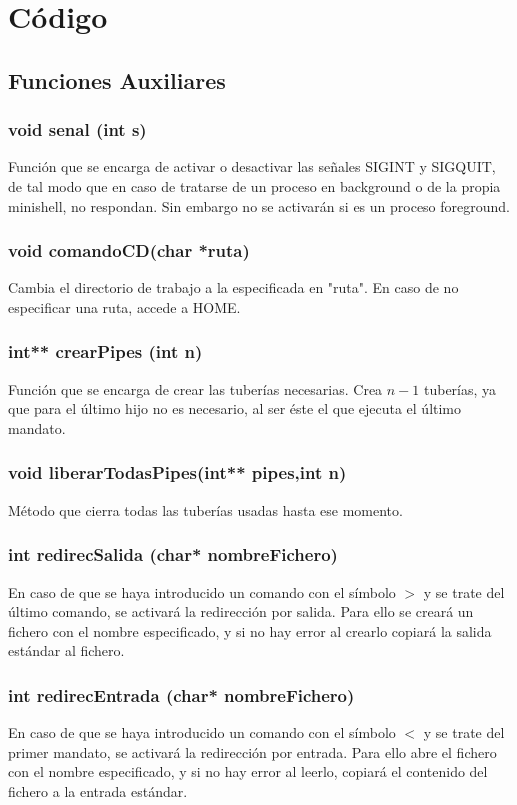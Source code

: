\chapter{Código}
\section{Funciones Auxiliares}
\subsection{void senal (int s)}
Función que se encarga de activar o desactivar las señales SIGINT y SIGQUIT, de tal modo que en caso de tratarse de un proceso en background o de la propia minishell, no respondan. Sin embargo no se activarán si es un proceso foreground.
\subsection{void comandoCD(char *ruta)}
Cambia el directorio de trabajo a la especificada en "ruta". En caso de no especificar una ruta, accede a HOME.
\subsection{int** crearPipes (int n)}
Función que se encarga de crear las tuberías necesarias. Crea $n-1$ tuberías, ya que para el último hijo no es necesario, al ser éste el que ejecuta el último mandato.
\subsection{void liberarTodasPipes(int** pipes,int n)}
Método que cierra todas las tuberías usadas hasta ese momento.
\subsection{int redirecSalida (char* nombreFichero)}
En caso de que se haya introducido un comando con el símbolo $>$ y se trate del último comando, se activará la redirección por salida. Para ello se creará un fichero con el nombre especificado, y si no hay error al crearlo copiará la salida estándar al fichero.
\subsection{int redirecEntrada (char* nombreFichero)}
En caso de que se haya introducido un comando con el símbolo $<$ y se trate del primer mandato, se activará la redirección por entrada. Para ello abre el fichero con el nombre especificado, y si no hay error al leerlo, copiará el contenido del fichero a la entrada estándar.
